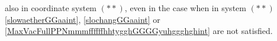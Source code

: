 \documentclass{article}
\theoremstyle{definition}
\theoremstyle{remark}
\newcommand{\er}{\eqref}
\newcommand{\er}{\eqref}
\begin{document}
also in coordinate system $(**)$, even in the case when in system
$(**)$ \er{slowaetherGGaaint}, \er{slochangGGaaint} or
\er{MaxVacFullPPNmmmffffffhhtygghGGGGyuhggghghint} are not
satisfied.
\end{document}

